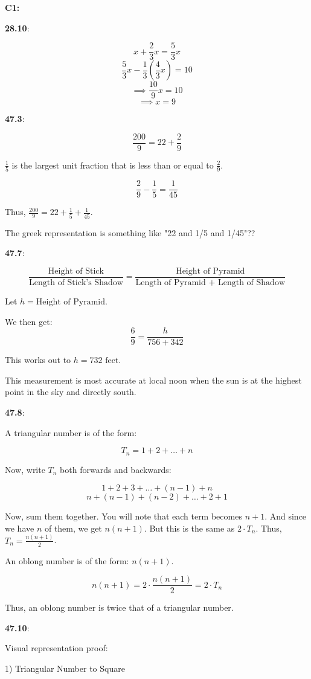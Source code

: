 \documentclass{article}
\begin{document}
\textbf{C1:}

\textbf{28.10}:

\[x + \frac{2}{3}x = \frac{5}{3}x\]
\[\frac{5}{3}x - \frac{1}{3}\left(\frac{4}{3}x\right) = 10\]
\[\implies \frac{10}{9}x = 10\]
\[\implies x = 9\]


\textbf{47.3}:

\[\frac{200}{9} = 22 + \frac{2}{9}\]

$\frac{1}{5}$ is the largest unit fraction that is less than or equal to $\frac{2}{9}$.

\[\frac{2}{9} - \frac{1}{5} = \frac{1}{45}\]

Thus, $\frac{200}{9} = 22 + \frac{1}{5} + \frac{1}{45}$.

The greek representation is something like "22 and 1/5 and 1/45"??


\textbf{47.7}:

\[\frac{\text{Height of Stick}}{\text{Length of Stick's Shadow}} =
\frac{\text{Height of Pyramid}}{\text{Length of Pyramid + Length of Shadow}}\]

Let $h = \text{Height of Pyramid}$.

We then get:
\[\frac{6}{9} = \frac{h}{756 + 342}\]

This works out to $h = 732 \text{ feet}$.

This measurement is most accurate at local noon when the sun is at the highest point
in the sky and directly south.


\textbf{47.8}:

A triangular number is of the form:

\[T_n = 1 + 2 + \dots + n\]

Now, write $T_n$ both forwards and backwards:

\[1 + 2 + 3 + \dots + (n-1) + n\]
\[n + (n-1) + (n-2) + \dots + 2 + 1\]

Now, sum them together.
You will note that each term becomes $n+1$. And since we have $n$ of them,
we get $n(n+1)$. But this is the same as $2 \cdot T_n$.
Thus, $T_n = \frac{n(n+1)}{2}$.

An oblong number is of the form: $n(n+1)$.

\[n(n+1) = 2 \cdot \frac{n(n+1)}{2} = 2 \cdot T_n\]

Thus, an oblong number is twice that of a triangular number.


\textbf{47.10}:

Visual representation proof:

1) Triangular Number to Square
\end{document}
